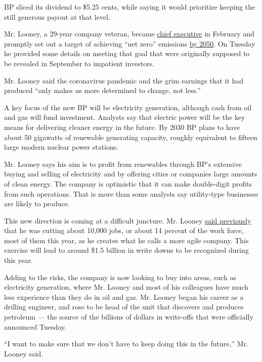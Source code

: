 BP sliced its dividend to \$5.25 cents, while saying it would prioritize
keeping the still generous payout at that level.

Mr. Looney, a 29-year company veteran, became
\href{https://www.nytimes3xbfgragh.onion/2019/10/04/business/bp-ceo-bob-dudley-bernard-looney.html}{chief
executive} in February and promptly set out a target of achieving ``net
zero'' emissions
\href{https://www.nytimes3xbfgragh.onion/2020/02/12/climate/bp-greenhouse-gas-emissions.html}{by
2050}. On Tuesday he provided some details on meeting that goal that
were originally supposed to be revealed in September to impatient
investors.

Mr. Looney said the coronavirus pandemic and the grim earnings that it
had produced ``only makes us more determined to change, not less.''

A key focus of the new BP will be electricity generation, although cash
from oil and gas will fund investment. Analysts say that electric power
will be the key means for delivering cleaner energy in the future. By
2030 BP plans to have about 50 gigawatts of renewable generating
capacity, roughly equivalent to fifteen large modern nuclear power
stations.

Mr. Looney says his aim is to profit from renewables through BP's
extensive buying and selling of electricity and by offering cities or
companies large amounts of clean energy. The company is optimistic that
it can make double-digit profits from such operations. That is more than
some analysts say utility-type businesses are likely to produce.

This new direction is coming at a difficult juncture. Mr. Looney
\href{https://www.bbc.com/news/explainers-52966609}{said previously}
that he was cutting about 10,000 jobs, or about 14 percent of the work
force, most of them this year, as he creates what he calls a more agile
company. This exercise will lead to around \$1.5 billion in write downs
to be recognized during this year.

Adding to the risks, the company is now looking to buy into areas, such
as electricity generation, where Mr. Looney and most of his colleagues
have much less experience than they do in oil and gas. Mr. Looney began
his career as a drilling engineer, and rose to be head of the unit that
discovers and produces petroleum --- the source of the billions of
dollars in write-offs that were officially announced Tuesday.

``I want to make sure that we don't have to keep doing this in the
future,'' Mr. Looney said.

